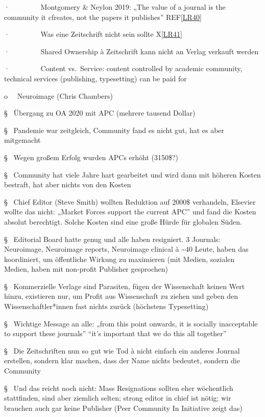 \documentclass[
  letterpaper,
  DIV=11,
  numbers=noendperiod]{scrreprt}
\begin{document}
·~~~~~~~~ Montgomery \& Neylon 2019: „The value of a journal is the
community it cfreates, not the papers it publishes''
REF\hyperref[_msocom_40]{{[}LR40{]}}~

·~~~~~~~~ Was eine Zeitschrift nicht sein sollte
X\hyperref[_msocom_41]{{[}LR41{]}}~

·~~~~~~~~ Shared Ownership à Zeitschrift kann nicht an Verlag verkauft
werden

·~~~~~~~~ Content vs.~Service: content controlled by academic community,
technical services (publishing, typesetting) can be paid for

o~~ Neuroimage (Chris Chambers)

§~ Übergang zu OA 2020 mit APC (mehrere tausend Dollar)

§~ Pandemie war zeitgleich, Community fand es nicht gut, hat es aber
mitgemacht

§~ Wegen großem Erfolg wurden APCs erhöht (3150\$?)

§~ Community hat viele Jahre hart gearbeitet und wird dann mit höheren
Kosten bestraft, hat aber nichts von den Kosten

§~ Chief Editor (Steve Smith) wollten Reduktion auf 2000\$ verhandeln,
Elsevier wollte das nicht: „Market Forces support the current APC'' und
fand die Kosten absolut berechtigt. Solche Kosten sind eine große Hürde
für globalen Süden.

§~ Editorial Board hatte genug und alle haben resigniert. 3 Journals:
Neuroimage, Neuroimage reports, Neuroimage clinical à \textasciitilde40
Leute, haben das koordiniert, um öffentliche Wirkung zu maximieren (mit
Medien, sozialen Medien, haben mit non-profit Publisher gesprochen)

§~ Kommerzielle Verlage sind Parasiten, fügen der Wissenschaft keinen
Wert hinzu, existieren nur, um Profit aus Wissenschaft zu ziehen und
geben den Wissenschaftler*innen fast nichts zurück (höchstens
Typesetting)

§~ Wichtige Message an alle: „from this point onwards, it is socially
inacceptable to support these journals'' ``it's important that we do
this all together''

§~ Die Zeitschriften nun so gut wie Tod à nicht einfach ein anderes
Journal erstellen, sondern klar machen, dass der Name nichts bedeutet,
sondern die Community

§~ Und das reicht noch nicht: Mass Resignations sollten eher wöchentlich
stattfinden, sind aber ziemlich selten; strong editor in chief ist
nötig; wir brauchen auch gar keine Publisher (Peer Community In
Initiative zeigt das)
\end{document}
